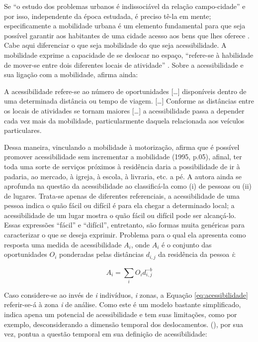 Se ``o estudo dos problemas urbanos é indissociável da relação campo-cidade'' \cite[p.154]{FREITAG2007} e por isso, independente da época estudada, é preciso tê-la em mente; especificamente a mobilidade urbana é um elemento fundamental para que seja possível garantir aos habitantes de uma cidade acesso aos bens que lhes oferece \cite{IEMA2010}. Cabe aqui diferenciar o que seja mobilidade do que seja acessibilidade. A mobilidade exprime a capacidade de se deslocar no espaço, ``refere-se à habilidade de mover-se entre dois diferentes locais de atividade'' \cite[p.04]{HANSON1995a}.
Sobre a acessibilidade e sua ligação com a mobilidade,  afirma ainda:

\begin{citacao}
A acessibilidade refere-se ao número de oportunidades [\ldots] disponíveis dentro de uma determinada distância ou tempo de viagem. [\ldots] Conforme as distâncias entre os locais de atividades se tornam maiores [\ldots] a acessibilidade passa a depender cada vez mais da mobilidade, particularmente daquela relacionada aos veículos particulares. \cite[p.04]{HANSON1995a}
\end{citacao}

Dessa maneira, vinculando a mobilidade à motorização,  afirma que é possível promover acessibilidade sem incrementar a mobilidade (1995, p.05), afinal, ter toda uma sorte de serviços próximos à residência daria a possibilidade de ir à padaria, ao mercado, à igreja, à escola, à livraria, etc. a pé. A autora ainda se aprofunda na questão da acessibilidade ao classificá-la como (i) de pessoas ou (ii) de lugares. Trata-se apenas de diferentes referenciais, a acessibilidade de uma pessoa indica o quão fácil ou difícil é para ela chegar a determinado local; a acessibilidade de um lugar mostra o quão fácil ou difícil pode ser alcançá-lo. Essas expressões ``fácil'' e ``difícil'', entretanto, são formas muita genéricas para caracterizar o que se deseja exprimir. Problema para o qual ela apresenta como resposta uma medida de acessibilidade $A_{i}$, onde $A_{i}$ é o conjunto das oportunidades $O_{i}$ ponderadas pelas distâncias $d_{i,j}$ da residência da pessoa \emph{i}:

\begin{equation}\label{eq:acessibilidade}
A_{i} = \sum_{i}^{} O_{i} d_{i,j}^ {-b}
\end{equation}

Caso considere-se ao invés de \emph{i} indivíduos, \emph{i} zonas, a Equação \ref{eq:acessibilidade} referir-se-á à zona \emph{i} de análise. Como este é um modelo bastante simplificado, indica apena um potencial de acessibilidade e tem suas limitações, como por exemplo, desconsiderando a dimensão temporal dos deslocamentos.
 (\citeyear{VASCONCELLOS2012}), por sua vez, pontua a questão temporal em sua definição de acessibilidade:


